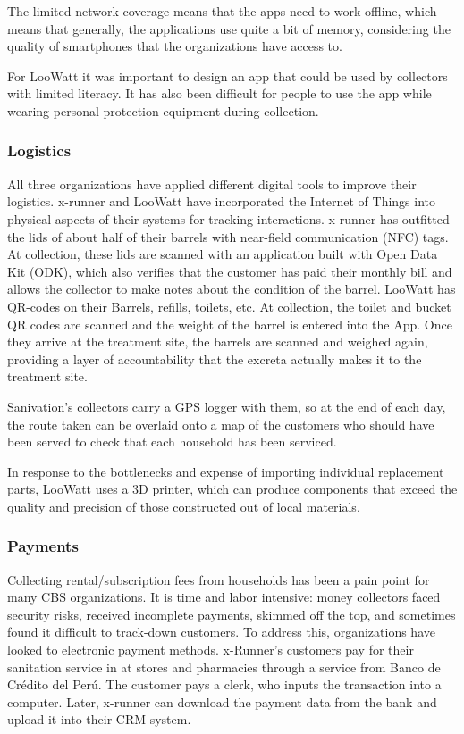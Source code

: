 \documentclass[sustainability,article,submit,moreauthors,pdftex,10pt,a4paper]{mdpi}
\theoremstyle{mdpi}
\newcounter{ex}
\newcounter{re}
\theoremstyle{mdpidefinition}
\begin{document}
The limited network coverage means that the apps need to work offline, which means that generally, the applications use quite a bit of memory, considering   the quality of  smartphones that the organizations have access to. %

For LooWatt it was important to design an app that could be used by collectors with limited literacy. It has also been difficult for people to use the app while wearing personal protection equipment during collection.  %



\subsubsection{Logistics}
All three organizations have applied different digital tools to improve their logistics. x-runner and LooWatt have incorporated the Internet of Things into physical aspects of their systems for tracking interactions. x-runner has outfitted the lids of about half of their barrels with near-field communication (NFC) tags. At collection, these lids are scanned with an application built with Open Data Kit (ODK), which also verifies that the customer has paid their monthly bill and allows the collector to make notes about the condition of the barrel.  LooWatt has QR-codes on their Barrels, refills, toilets, etc. At collection, the toilet and bucket QR codes are scanned and the weight of the barrel is entered into the App. Once they arrive at the treatment site, the barrels are scanned and weighed again, providing a layer of accountability that the excreta actually makes it to the treatment site. 

Sanivation's collectors carry a GPS logger with them, so at the end of each day, the route taken can be overlaid onto a map of the customers who should have been served to check that each household has been serviced.

In response to the bottlenecks and expense of importing individual replacement parts, LooWatt uses a 3D printer, which can produce components that exceed the quality and precision of those constructed out of local materials. 





\subsubsection{Payments}
Collecting rental/subscription fees from households has been a pain point for many CBS organizations. It is time and labor intensive: money collectors faced security risks, received incomplete payments, skimmed off the top, and sometimes found it difficult to track-down customers. To address this, organizations have looked to electronic payment methods. x-Runner's customers pay for their sanitation service in at stores and pharmacies through a service from Banco de Crédito del Perú. The customer pays a clerk, who inputs the transaction into a computer. Later, x-runner can download the payment data from the bank and upload it into their CRM system. 
\end{document}
